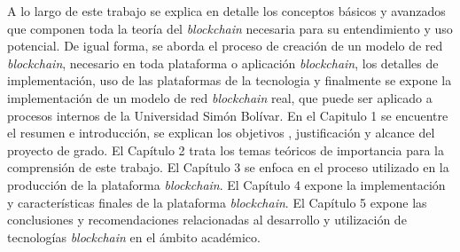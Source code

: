 A lo largo de este trabajo se explica en detalle los conceptos básicos y avanzados que componen toda la teoría del \textit{blockchain} necesaria para su entendimiento y uso potencial. De igual forma, se aborda el proceso de creación de un modelo de red \textit{blockchain}, necesario en toda plataforma o aplicación \textit{blockchain}, los detalles de implementación,  uso de las plataformas de la tecnologia y finalmente se expone la implementación de un modelo de red \textit{blockchain} real, que puede ser aplicado a procesos internos de la Universidad Simón Bolívar. En el Capitulo 1 se encuentre  el resumen e introducción, se explican los objetivos , justificación y alcance del proyecto de grado. El Capítulo 2 trata los temas teóricos de importancia para la comprensión de este trabajo. El Capítulo 3 se enfoca en el proceso utilizado en la producción de la plataforma \textit{blockchain}. El Capítulo 4 expone la implementación y características finales de la plataforma \textit{blockchain}. El Capítulo 5 expone las conclusiones y recomendaciones relacionadas al desarrollo y utilización de tecnologías \textit{blockchain} en el ámbito académico.


